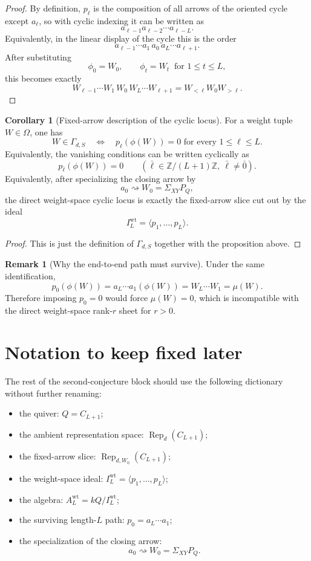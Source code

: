 \documentclass{article}
\newcommand{\Rep}{\operatorname{Rep}}
\theoremstyle{definition}
\newtheorem{corollary}[theorem]{Corollary}
\newtheorem{remark}[theorem]{Remark}
\begin{document}
\begin{proof}
By definition, $p_\ell$ is the composition of all arrows of the oriented cycle
except $a_\ell$, so with cyclic indexing it can be written as
\[
a_{\ell-1}a_{\ell-2}\cdots a_{\ell-L}.
\]
Equivalently, in the linear display of the cycle this is the order
\[
a_{\ell-1}\cdots a_1\,a_0\,a_L\cdots a_{\ell+1}.
\]
After substituting
\[
\phi_0=W_0,
\qquad
\phi_t=W_t \ \text{ for } 1\le t\le L,
\]
this becomes exactly
\[
W_{\ell-1}\cdots W_1\,W_0\,W_L\cdots W_{\ell+1}
=
W_{<\ell}W_0W_{>\ell}.
\]
\end{proof}

\begin{corollary}[Fixed-arrow description of the cyclic locus]
For a weight tuple $W\in\Omega$, one has
\[
W\in \Gamma_{d,S}
\quad\Longleftrightarrow\quad
p_\ell(\phi(W))=0
\text{ for every }1\le \ell\le L.
\]
Equivalently, the vanishing conditions can be written cyclically as
\[
p_{\bar\ell}(\phi(W))=0
\qquad
(\bar\ell\in \mathbb Z/(L+1)\mathbb Z,\ \bar\ell\neq \bar 0).
\]
Equivalently, after specializing the closing arrow by
\[
a_0 \rightsquigarrow W_0=\Sigma_{XY}P_Q,
\]
the direct weight-space cyclic locus is exactly the fixed-arrow slice cut out by
the ideal
\[
I_L^{\mathrm{wt}}=\langle p_1,\dots,p_L\rangle.
\]
\end{corollary}

\begin{proof}
This is just the definition of $\Gamma_{d,S}$ together with the proposition
above.
\end{proof}

\begin{remark}[Why the end-to-end path must survive]
Under the same identification,
\[
p_0(\phi(W))
=
a_L\cdots a_1(\phi(W))
=
W_L\cdots W_1
=
\mu(W).
\]
Therefore imposing $p_0=0$ would force $\mu(W)=0$, which is incompatible with
the direct weight-space rank-$r$ sheet for $r>0$.
\end{remark}

\section{Notation to keep fixed later}

The rest of the second-conjecture block should use the following dictionary
without further renaming:

\begin{itemize}
\item the quiver: $Q=C_{L+1}$;
\item the ambient representation space: $\Rep_d(C_{L+1})$;
\item the fixed-arrow slice: $\Rep_{d,W_0}(C_{L+1})$;
\item the weight-space ideal: $I_L^{\mathrm{wt}}=\langle p_1,\dots,p_L\rangle$;
\item the algebra: $A_L^{\mathrm{wt}}=kQ/I_L^{\mathrm{wt}}$;
\item the surviving length-$L$ path: $p_0=a_L\cdots a_1$;
\item the specialization of the closing arrow:
\[
a_0 \rightsquigarrow W_0=\Sigma_{XY}P_Q.
\]
\end{itemize}
\end{document}
